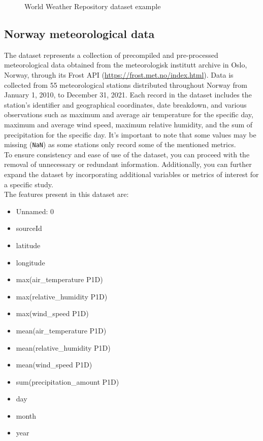 \documentclass[12pt]{article}
\begin{document}
\begin{figure}[h]
\begin{subfigure}{0.48\textwidth}
      \label{fig:sub2}
    \end{subfigure}
    \caption{World Weather Repository dataset example}
    \label{fig:combined}
  \end{figure}

\newpage
\subsection{Norway meteorological data}
The dataset \cite{Norway-Meteorological-Dataset} represents a collection of precompiled and pre-processed meteorological data obtained from the meteorologisk institutt archive in Oslo, Norway, through its Frost API (\url{https://frost.met.no/index.html}).
Data is collected from 55 meteorological stations distributed throughout Norway from January 1, 2010, to December 31, 2021. Each record in the dataset includes the station's identifier and geographical coordinates, date breakdown, and various observations such as maximum and average air temperature for the specific day, maximum and average wind speed, maximum relative humidity, and the sum of precipitation for the specific day. It's important to note that some values may be missing (\texttt{NaN}) as some stations only record some of the mentioned metrics.
\\
To ensure consistency and ease of use of the dataset, you can proceed with the removal of unnecessary or redundant information. Additionally, you can further expand the dataset by incorporating additional variables or metrics of interest for a specific study.
\\
The features present in this dataset are:
\begin{itemize}
    \item Unnamed: 0
    \item sourceId
    \item latitude
    \item longitude
    \item max(air\_temperature P1D)
    \item max(relative\_humidity P1D)
    \item max(wind\_speed P1D)
    \item mean(air\_temperature P1D)
    \item mean(relative\_humidity P1D)
    \item mean(wind\_speed P1D)
    \item sum(precipitation\_amount P1D)
    \item day
    \item month
    \item year
\end{itemize}
\end{document}
